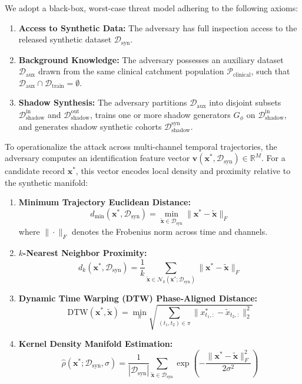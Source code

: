 \documentclass[journal]{IEEEtran}
\begin{document}
We adopt a black-box, worst-case threat model adhering to the following axioms:
\begin{enumerate}
    \item \textbf{Access to Synthetic Data:} The adversary has full inspection access to the released synthetic dataset $\mathcal{D}_{\text{syn}}$.
    \item \textbf{Background Knowledge:} The adversary possesses an auxiliary dataset $\mathcal{D}_{\text{aux}}$ drawn from the same clinical catchment population $\mathcal{P}_{\text{clinical}}$, such that $\mathcal{D}_{\text{aux}} \cap \mathcal{D}_{\text{train}} = \emptyset$.
    \item \textbf{Shadow Synthesis:} The adversary partitions $\mathcal{D}_{\text{aux}}$ into disjoint subsets $\mathcal{D}_{\text{shadow}}^{\text{in}}$ and $\mathcal{D}_{\text{shadow}}^{\text{out}}$, trains one or more shadow generators $G_\phi$ on $\mathcal{D}_{\text{shadow}}^{\text{in}}$, and generates shadow synthetic cohorts $\mathcal{D}_{\text{shadow}}^{\text{syn}}$.
\end{enumerate}

To operationalize the attack across multi-channel temporal trajectories, the adversary computes an identification feature vector $\mathbf{v}(\mathbf{x}^*, \mathcal{D}_{\text{syn}}) \in \mathbb{R}^M$. For a candidate record $\mathbf{x}^*$, this vector encodes local density and proximity relative to the synthetic manifold:
\begin{enumerate}
    \item \textbf{Minimum Trajectory Euclidean Distance:}
    \begin{equation}
    d_{\min}(\mathbf{x}^*, \mathcal{D}_{\text{syn}}) = \min_{\tilde{\mathbf{x}} \in \mathcal{D}_{\text{syn}}} \|\mathbf{x}^* - \tilde{\mathbf{x}}\|_F
    \end{equation}
    where $\|\cdot\|_F$ denotes the Frobenius norm across time and channels.
    \item \textbf{$k$-Nearest Neighbor Proximity:}
    \begin{equation}
    d_k(\mathbf{x}^*, \mathcal{D}_{\text{syn}}) = \frac{1}{k} \sum_{\tilde{\mathbf{x}} \in \mathcal{N}_k(\mathbf{x}^*; \mathcal{D}_{\text{syn}})} \|\mathbf{x}^* - \tilde{\mathbf{x}}\|_F
    \end{equation}
    \item \textbf{Dynamic Time Warping (DTW) Phase-Aligned Distance:}
    \begin{equation}
    \text{DTW}(\mathbf{x}^*, \tilde{\mathbf{x}}) = \min_{\pi} \sqrt{\sum_{(t_1, t_2) \in \pi} \|x^*_{t_1, :} - \tilde{x}_{t_2, :}\|_2^2}
    \end{equation}
    \item \textbf{Kernel Density Manifold Estimation:}
    \begin{equation}
    \hat{\rho}(\mathbf{x}^*; \mathcal{D}_{\text{syn}}, \sigma) = \frac{1}{|\mathcal{D}_{\text{syn}}|} \sum_{\tilde{\mathbf{x}} \in \mathcal{D}_{\text{syn}}} \exp\left(-\frac{\|\mathbf{x}^* - \tilde{\mathbf{x}}\|_F^2}{2\sigma^2}\right)
    \end{equation}
\end{enumerate}
\end{document}
